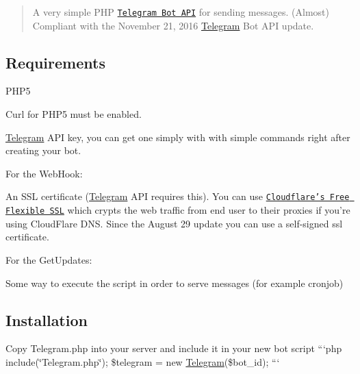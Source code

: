 \begin{quotation}
A very simple P\-H\-P \href{https://core.telegram.org/bots}{\tt Telegram Bot A\-P\-I} for sending messages. (Almost) Compliant with the November 21, 2016 \hyperlink{class_telegram}{Telegram} Bot A\-P\-I update.

\end{quotation}


\subsection*{Requirements }


\begin{DoxyItemize}
\item P\-H\-P5
\item Curl for P\-H\-P5 must be enabled.
\item \hyperlink{class_telegram}{Telegram} A\-P\-I key, you can get one simply with \href{https://core.telegram.org/bots#botfather}{\tt } with simple commands right after creating your bot.
\end{DoxyItemize}

For the Web\-Hook\-:
\begin{DoxyItemize}
\item An S\-S\-L certificate (\hyperlink{class_telegram}{Telegram} A\-P\-I requires this). You can use \href{https://www.cloudflare.com/ssl}{\tt Cloudflare's Free Flexible S\-S\-L} which crypts the web traffic from end user to their proxies if you're using Cloud\-Flare D\-N\-S. Since the August 29 update you can use a self-\/signed ssl certificate.
\end{DoxyItemize}

For the Get\-Updates\-:
\begin{DoxyItemize}
\item Some way to execute the script in order to serve messages (for example cronjob)
\end{DoxyItemize}

\subsection*{Installation }


\begin{DoxyItemize}
\item Copy Telegram.\-php into your server and include it in your new bot script ```php include(\char`\"{}\-Telegram.\-php\char`\"{}); \$telegram = new \hyperlink{class_telegram}{Telegram}(\$bot\-\_\-id); ```
\end{DoxyItemize}

